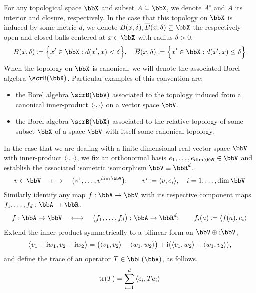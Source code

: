For any topological space $\stateSpace$ and subset $A \subseteq \stateSpace$, we denote $A^\circ$ and $\overline A$ its interior and closure, respectively.
In the case that this topology on $\stateSpace$ is induced by some metric $d$, we denote $\ball{\stateVar}{\delta}, \closedBall{\stateVar}{\delta} \subseteq \stateSpace$ the respectively open and closed balls centered at $\stateVar \in \stateSpace$ with radius $\delta > 0$.
\begin{equation*}
  \ball{\stateVar}{\delta} \defeq \Big\{ \stateVar' \in \stateSpace : d(\stateVar', \stateVar) < \delta \Big\}, \quad
  \closedBall{\stateVar}{\delta} \defeq \Big\{ \stateVar' \in \stateSpace : d(\stateVar', \stateVar) \leq \delta \Big\}
\end{equation*}
When the topology on $\stateSpace$ is canonical, we will denote the associated Borel algebra $\scrB(\stateSpace)$.
Particular examples of this convention are:
\begin{itemize}
  \item
    the Borel algebra $\scrB(\vecSpace)$ associated to the topology induced from a canonical inner-product ${\langle \cdot , \cdot \rangle}$ on a vector space $\vecSpace$.
  \item
    the Borel algebra $\scrB(\stateSpace)$ associated to the relative topology of some subset $\stateSpace$ of a space $\vecSpace$ with itself some canonical topology.
\end{itemize}
In the case that we are dealing with a finite-dimensional real vector space $\vecSpace$ with inner-product ${\langle \cdot , \cdot \rangle}$, we fix an orthonormal basis $\basisVec_1, \ldots, \basisVec_{\operatorname{dim}\vecSpace} \in \vecSpace$ and establish the associated isometric isomorphism $\vecSpace \equiv \bbR^d$.
\begin{equation*}
  \vecVar \in \vecSpace \quad\longleftrightarrow\quad \big(\vecVar^1, \ldots, \vecVar^{\operatorname{dim}\vecSpace}\big); \qquad \vecVar^i \defeq \prj{\vecVar}{\basisVec_i}, \quad i = 1, \ldots, \operatorname{dim}\vecSpace
\end{equation*}
Similarly identify any map $f: \bbA \rightarrow \vecSpace$ with its respective component maps $f_1, \ldots, f_d: \bbA \rightarrow \bbR$.
\begin{equation*}
  f: \bbA \rightarrow \vecSpace \quad\longleftrightarrow\quad \big(f_1,\ldots, f_d\big): \bbA \rightarrow \bbR^d; \qquad f_i(a) \defeq \prj{f(a)}{\basisVec_i}
\end{equation*}
Extend the inner-product symmetrically to a bilinear form on $\vecSpace\oplus\im\vecSpace$,
\begin{equation*}
  {\big\langle v_1+{\rm i}w_1 , v_2 + {\rm i}w_2 \big\rangle} = \big({\langle v_1 , v_2 \rangle} - {\langle w_1 , w_2 \rangle}\big) + {\rm i}\big({\langle v_1 , w_2 \rangle} + {\langle w_1 , v_2 \rangle}\big),
\end{equation*}
and define the trace of an operator $T \in \bbL(\vecSpace)$, as follows.
\begin{equation*}
  \operatorname{tr}(T) = \sum_{i=1}^d {\langle e_i , Te_i \rangle}
\end{equation*}

